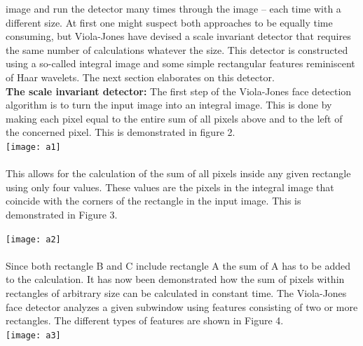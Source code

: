 \documentclass[a4paper, 12pt]{report}
\begin{document}
image and run the detector many times through the image – each time with a different size.
At first one might suspect both approaches to be equally time consuming, but Viola-Jones have
devised a scale invariant detector that requires the same number of calculations whatever the
size. This detector is constructed using a so-called integral image and some simple rectangular
features reminiscent of Haar wavelets. The next section elaborates on this detector.\\
\textbf{The scale invariant detector:} The first step of the Viola-Jones face detection algorithm
is to turn the input image into an integral image. This is done by making each pixel equal to
the entire sum of all pixels above and to the left of the concerned pixel. This is demonstrated
in figure 2.\\
\texttt{[image: a1]}\paragraph{}
This allows for the calculation of the sum of all pixels inside any given rectangle using only
four values. These values are the pixels in the integral image that coincide with the corners of
the rectangle in the input image. This is demonstrated in Figure 3.


\texttt{[image: a2]}
\paragraph{}
Since both rectangle B and C include rectangle A the sum of A has to be added to the
calculation. It has now been demonstrated how the sum of pixels within rectangles of arbitrary
size can be calculated in constant time. The Viola-Jones face detector analyzes a given subwindow using features consisting of two or more rectangles. The different types of features are
shown in Figure 4.
\\
\texttt{[image: a3]}
\end{document}
